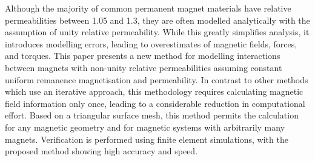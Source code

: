 Although the majority of common permanent magnet materials have relative permeabilities between 1.05 and 1.3, they are often modelled analytically with the assumption of unity relative permeability. While this greatly simplifies analysis, it introduces modelling errors, leading to overestimates of magnetic fields, forces, and torques. This paper presents a new method for modelling interactions between magnets with non-unity relative permeabilities assuming constant uniform remanence magnetisation and permeability. In contrast to other methods which use an iterative approach, this methodology requires calculating magnetic field information only once, leading to a considerable reduction in computational effort. Based on a triangular surface mesh, this method permits the calculation for any magnetic geometry and for magnetic systems with arbitrarily many magnets. Verification is performed using finite element simulations, with the proposed method showing high accuracy and speed.